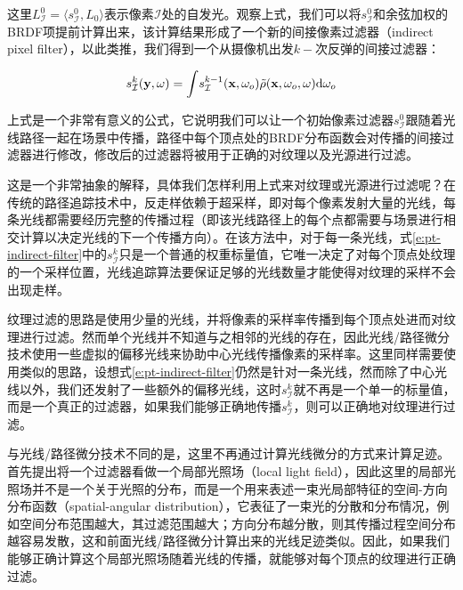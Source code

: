 \noindent 这里$L^{0}_{\mathcal{I}}=\langle s^{0}_{\mathcal{I}},L_0\rangle$表示像素$\mathcal{I}$处的自发光。观察上式，我们可以将$s^{0}_{\mathcal{I}}$和余弦加权的BRDF项提前计算出来，该计算结果形成了一个新的间接像素过滤器（indirect pixel filter），以此类推，我们得到一个从摄像机出发$k-$次反弹的间接过滤器：

\begin{equation}\label{e:pt-indirect-filter}
	s^{k}_{\mathcal{I}}(\mathbf{y},\omega)={\rm \int} s^{k-1}_{\mathcal{I}}(\mathbf{x},\omega_o)\tilde{\rho}(\mathbf{x},\omega_o,\omega){\rm d}\omega_o
\end{equation}

\noindent 上式是一个非常有意义的公式，它说明我们可以让一个初始像素过滤器$s^{0}_{\mathcal{I}}$跟随着光线路径一起在场景中传播，路径中每个顶点处的BRDF分布函数会对传播的间接过滤器进行修改，修改后的过滤器将被用于正确的对纹理以及光源进行过滤。

这是一个非常抽象的解释，具体我们怎样利用上式来对纹理或光源进行过滤呢？在传统的路径追踪技术中，反走样依赖于超采样，即对每个像素发射大量的光线，每条光线都需要经历完整的传播过程（即该光线路径上的每个点都需要与场景进行相交计算以决定光线的下一个传播方向）。在该方法中，对于每一条光线，式\ref{e:pt-indirect-filter}中的$s^{k}_{\mathcal{I}}$只是一个普通的权重标量值，它唯一决定了对每个顶点处纹理的一个采样位置，光线追踪算法要保证足够的光线数量才能使得对纹理的采样不会出现走样。

纹理过滤的思路是使用少量的光线，并将像素的采样率传播到每个顶点处进而对纹理进行过滤。然而单个光线并不知道与之相邻的光线的存在，因此光线/路径微分技术使用一些虚拟的偏移光线来协助中心光线传播像素的采样率。这里同样需要使用类似的思路，设想式\ref{e:pt-indirect-filter}仍然是针对一条光线，然而除了中心光线以外，我们还发射了一些额外的偏移光线，这时$s^{k}_{\mathcal{I}}$就不再是一个单一的标量值，而是一个真正的过滤器，如果我们能够正确地传播$s^{k}_{\mathcal{I}}$，则可以正确地对纹理进行过滤。

与光线/路径微分技术不同的是，这里不再通过计算光线微分的方式来计算足迹。\cite{a:AFrequencyAnalysisofLightTransport}首先提出将一个过滤器看做一个局部光照场（local light field），因此这里的局部光照场并不是一个关于光照的分布，而是一个用来表述一束光局部特征的空间-方向分布函数（spatial-angular distribution），它表征了一束光的分散和分布情况，例如空间分布范围越大，其过滤范围越大；方向分布越分散，则其传播过程空间分布越容易发散，这和前面光线/路径微分计算出来的光线足迹类似。因此，如果我们能够正确计算这个局部光照场随着光线的传播，就能够对每个顶点的纹理进行正确过滤。

